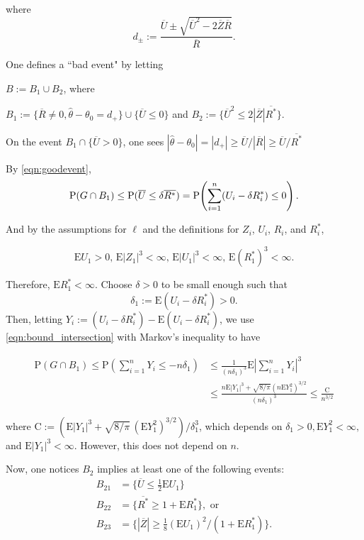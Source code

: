 where
$$
d_{\pm}:=\frac{\overline{U}\pm\sqrt{\overline{U}^{2}-2\overline{Z}\overline{R}}}{\overline{R}}.
$$

One defines a ``bad event" by letting

$B :=B_{1}\cup B_{2}$, where

$B_{1} :=\{\overline{R}\neq 0,\hat{\theta}-\theta_{0}=d_{+}\}\cup\{\overline{U}\leq 0\}$ and $B_{2} :=\{\overline{U}^{2}\leq 2|\overline{Z}|\overline{R^{*}}\}.$

On the event $B_1 \cap \{\overline{U}>0\}$, one sees $|\hat{\theta}-\theta_{0}|=|d_{+}|\geq \overline{U}/|\overline{R}|\geq\overline{U}/\overline{R^{*}}$

By \eqref{eqn:goodevent},
\begin{equation}\label{eqn:bound_intersection}
\mathrm{P}(G\cap B_1)\leq\mathrm{P}(\overline{U}\leq\delta\overline{R^*})
=\mathrm{P}\!\left(\sum_{i=1}^n(U_i-\delta R_i^*)\leq0\right).
\end{equation}

And by the assumptions for $\ell$ and the definitions for $Z_i$, $U_i$, $R_i$, and $R^{*}_i$,

\[
\mathrm{E}U_{1}>0,\, \mathrm{E}|Z_{1}|^{3}<\infty,\, \mathrm{E}|U_{1}|^{3}<\infty,\, \mathrm{E}(R_{1}^{*})^{3}<\infty.
\]

Therefore, $\mathrm{E}R_{1}^{*}<\infty$. Choose $\delta>0$ to be small enough such that
$$
\delta_{1}:=\mathrm{E}(U_{i}-\delta R_{i}^{*})>0.
$$
Then, letting $Y_{i} :=(U_{i}-\delta R_{i}^{*})-\mathrm{E}(U_{i}-\delta R_{i}^{*})$, we use \eqref{eqn:bound_intersection} with Markov's inequality to have

\begin{align*}
	\mathrm{P}(G\cap B_{1})\leq \mathrm{P}(\sum_{i=1}^{n}Y_{i}\leq-n\delta_{1})&\leq\frac{1}{(n\delta_{1})^{3}}\mathrm{E}|\sum_{i=1}^{n}Y_{i}|^{3}
	\\
	&\leq\frac{n\mathrm{E}|Y_{1}|^{3}+\sqrt{8/\pi}(n\mathrm{E}Y_{1}^{2})^{3/2}}{(n\delta_{1})^{3}}\leq\frac{\mathrm{C}}{n^{3/2}}
\end{align*}

where $\mathrm{C}:=(\mathrm{E}|Y_{1}|^{3}+\sqrt{8/\pi}\,(\mathrm{E}Y_{1}^{2})^{3/2})/\delta_{1}^{3}$, which depends on $\delta_{1}>0, \mathrm{E}Y_{1}^{2}<\infty,$ and $\mathrm{E}|Y_{1}|^{3}<\infty$. However, this does not depend on $n$.

Now, one notices $B_{2}$ implies at least one of the following events:
\begin{align*}
	B_{21} &=\displaystyle\{\overline{U}\leq\frac{1}{2}\mathrm{E}U_{1}\} \\
	B_{22} &=\{\overline{R^{*}}\geq 1+\mathrm{E}R_{1}^{*}\}, \textrm{ or}\\ 
	B_{23} &= \displaystyle \{|\overline{Z}|\geq\frac{1}{8}(\mathrm{E}U_{1})^{2}/(1+\mathrm{E}R_{1}^{*})\}. 
\end{align*}

